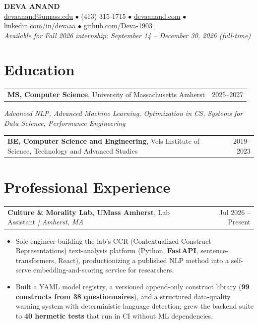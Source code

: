 \documentclass[letterpaper,11pt]{article}
\makeatletter
\newcommand{\eduItem}[3]{%
  \begin{tabular*}{\textwidth}{@{}l@{\extracolsep{\fill}}r@{}}
    \textbf{#1}, #2 & #3 \\
  \end{tabular*}\par
}
\newcommand{\expItem}[4]{%
  \vspace{2pt}
  \begin{tabular*}{\textwidth}{@{}l@{\extracolsep{\fill}}r@{}}
    \textbf{#1}, #2 \textit{| #3} & #4 \\
  \end{tabular*}\par\vspace{-3pt}
}
\makeatother
\begin{document}
\begin{center}
    {\fontsize{18}{20}\selectfont\bfseries DEVA ANAND}\\ \vspace{3pt}
    {\small
    \href{mailto:devaanand@umass.edu}{devaanand@umass.edu}
    \enspace$\bullet$\enspace
    (413) 315-1715
    \enspace$\bullet$\enspace
    \href{https://devaanand.com}{devaanand.com}
    \enspace$\bullet$\enspace
    \href{https://linkedin.com/in/devaaa/}{linkedin.com/in/devaaa}
    \enspace$\bullet$\enspace
    \href{https://github.com/Deva-1903}{github.com/Deva-1903}}\\ \vspace{2pt}
    {\small\textit{Available for Fall 2026 internship: September 14 -- December 30, 2026 (full-time)}}
\end{center}
\vspace{-8pt}

\section{Education}
\eduItem{MS, Computer Science}{University of Massachusetts Amherst}{2025--2027}
{\small\textit{Advanced NLP, Advanced Machine Learning, Optimization in CS, Systems for Data Science, Performance Engineering}}\par
\vspace{3pt}
\eduItem{BE, Computer Science and Engineering}{Vels Institute of Science, Technology and Advanced Studies}{2019--2023}

\section{Professional Experience}

\expItem{Culture \& Morality Lab, UMass Amherst}{Lab Assistant}{Amherst, MA}{Jul 2026 -- Present}
\begin{itemize}
  \item Sole engineer building the lab's CCR (Contextualized Construct Representations) text-analysis platform (Python, \textbf{FastAPI}, sentence-transformers, React), productionizing a published NLP method into a self-serve embedding-and-scoring service for researchers.
  \item Built a YAML model registry, a versioned append-only construct library (\textbf{99 constructs from 38 questionnaires}), and a structured data-quality warning system with deterministic language detection; grew the backend suite to \textbf{40 hermetic tests} that run in CI without ML dependencies.
\end{itemize}
\end{document}

